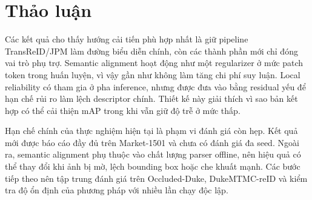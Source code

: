 \section{Thảo luận}
\label{sec:discussion}

Các kết quả cho thấy hướng cải tiến phù hợp nhất là giữ pipeline
TransReID/JPM làm đường biểu diễn chính, còn các thành phần mới chỉ đóng vai
trò phụ trợ. Semantic alignment hoạt động như một regularizer ở mức patch token
trong huấn luyện, vì vậy gần như không làm tăng chi phí suy luận. Local
reliability có tham gia ở pha inference, nhưng được đưa vào bằng residual yếu
để hạn chế rủi ro làm lệch descriptor chính. Thiết kế này giải thích vì sao bản
kết hợp có thể cải thiện mAP trong khi vẫn giữ độ trễ ở mức thấp.

Hạn chế chính của thực nghiệm hiện tại là phạm vi đánh giá còn hẹp. Kết quả mới
được báo cáo đầy đủ trên Market-1501 và chưa có đánh giá đa seed. Ngoài ra,
semantic alignment phụ thuộc vào chất lượng parser offline, nên hiệu quả có thể
thay đổi khi ảnh bị mờ, lệch bounding box hoặc che khuất mạnh. Các bước tiếp
theo nên tập trung đánh giá trên Occluded-Duke, DukeMTMC-reID và kiểm tra độ ổn
định của phương pháp với nhiều lần chạy độc lập.
